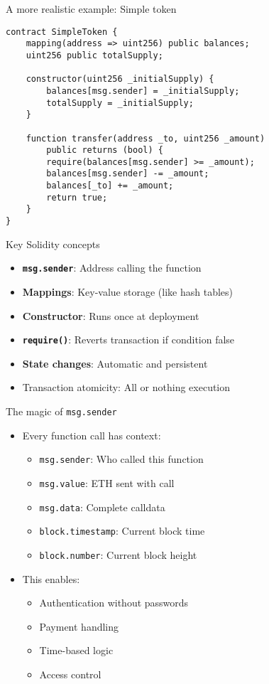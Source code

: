 \documentclass[aspectratio=169, lualatex, handout]{beamer}
\begin{document}
\begin{frame}[fragile]{A more realistic example: Simple token}
	\scriptsize
	\begin{verbatim}
contract SimpleToken {
    mapping(address => uint256) public balances;
    uint256 public totalSupply;

    constructor(uint256 _initialSupply) {
        balances[msg.sender] = _initialSupply;
        totalSupply = _initialSupply;
    }

    function transfer(address _to, uint256 _amount)
        public returns (bool) {
        require(balances[msg.sender] >= _amount);
        balances[msg.sender] -= _amount;
        balances[_to] += _amount;
        return true;
    }
}
\end{verbatim}
\end{frame}

\begin{frame}{Key Solidity concepts}
	\begin{itemize}
		\item \textbf{\texttt{msg.sender}}: Address calling the function
		\item \textbf{Mappings}: Key-value storage (like hash tables)
		\item \textbf{Constructor}: Runs once at deployment
		\item \textbf{\texttt{require()}}: Reverts transaction if condition false
		\item \textbf{State changes}: Automatic and persistent
		\item Transaction atomicity: All or nothing execution
	\end{itemize}
\end{frame}

\begin{frame}{The magic of \texttt{msg.sender}}
	\begin{itemize}
		\item Every function call has context:
		      \begin{itemize}
			      \item \texttt{msg.sender}: Who called this function
			      \item \texttt{msg.value}: ETH sent with call
			      \item \texttt{msg.data}: Complete calldata
			      \item \texttt{block.timestamp}: Current block time
			      \item \texttt{block.number}: Current block height
		      \end{itemize}
		\item This enables:
		      \begin{itemize}
			      \item Authentication without passwords
			      \item Payment handling
			      \item Time-based logic
			      \item Access control
		      \end{itemize}
	\end{itemize}
\end{frame}
\end{document}
